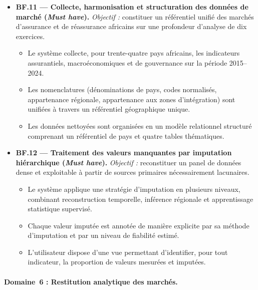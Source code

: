 \documentclass[../main.tex]{subfiles}
\begin{document}
\begin{itemize}[leftmargin=1.5cm, itemsep=6pt]

  \item \textbf{BF.11 --- Collecte, harmonisation et structuration des données de marché (\textit{Must have}).}
  \emph{Objectif :} constituer un référentiel unifié des marchés d'assurance et de réassurance africains sur une profondeur d'analyse de dix exercices.
  \begin{itemize}[label=\textendash, itemsep=2pt]
    \item Le système collecte, pour trente-quatre pays africains, les indicateurs assurantiels, macroéconomiques et de gouvernance sur la période 2015--2024.
    \item Les nomenclatures (dénominations de pays, codes normalisés, appartenance régionale, appartenance aux zones d'intégration) sont unifiées à travers un référentiel géographique unique.
    \item Les données nettoyées sont organisées en un modèle relationnel structuré comprenant un référentiel de pays et quatre tables thématiques.
  \end{itemize}

  \item \textbf{BF.12 --- Traitement des valeurs manquantes par imputation hiérarchique (\textit{Must have}).}
  \emph{Objectif :} reconstituer un panel de données dense et exploitable à partir de sources primaires nécessairement lacunaires.
  \begin{itemize}[label=\textendash, itemsep=2pt]
    \item Le système applique une stratégie d'imputation en plusieurs niveaux, combinant reconstruction temporelle, inférence régionale et apprentissage statistique supervisé.
    \item Chaque valeur imputée est annotée de manière explicite par sa méthode d'imputation et par un niveau de fiabilité estimé.
    \item L'utilisateur dispose d'une vue permettant d'identifier, pour tout indicateur, la proportion de valeurs mesurées et imputées.
  \end{itemize}

\end{itemize}

\paragraph{Domaine~6 : Restitution analytique des marchés.}
\end{document}
